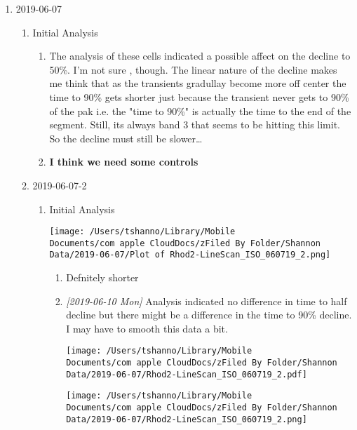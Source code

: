 \documentclass[11pt]{article}
\begin{document}
\begin{enumerate}
\begin{enumerate}
\begin{enumerate}
\begin{enumerate}
\end{enumerate}
\end{enumerate}
\end{enumerate}
\item 2019-06-07
\label{sec:org4dc39f4}
\begin{enumerate}
\item Initial Analysis
\label{sec:org57a14bd}
\begin{enumerate}
\item The analysis of these cells indicated a possible affect on the decline to 50\%.  I'm not sure , though.  The  linear nature of the decline makes me think that as the transients gradullay become more off center the time to 90\% gets shorter just because the transient never gets to 90\% of the pak i.e. the "time to 90\%" is actually the time to the end of the segment.  Still, its always band 3 that seems to be hitting this limit.  So the decline must still be slower\ldots{}
\label{sec:org21e6555}
\item \textbf{I think we need some controls}
\label{sec:org1bd4fc6}
\end{enumerate}
\item 2019-06-07-2
\label{sec:org2132be7}
\begin{enumerate}
\item Initial Analysis
\label{sec:orgee5613b}
\begin{center}
\texttt{[image: /Users/tshanno/Library/Mobile Documents/com~apple~CloudDocs/zFiled By Folder/Shannon Data/2019-06-07/Plot of Rhod2-LineScan\_ISO\_060719\_2.png]}
\end{center}
\begin{enumerate}
\item Defnitely shorter
\label{sec:orgc08e346}
\item \textit{[2019-06-10 Mon] } Analysis indicated no difference in time to half decline but there might be a difference in the time to 90\% decline.  I may have to smooth this data a bit.
\label{sec:org4ae7f59}
\begin{center}
\texttt{[image: /Users/tshanno/Library/Mobile Documents/com~apple~CloudDocs/zFiled By Folder/Shannon Data/2019-06-07/Rhod2-LineScan\_ISO\_060719\_2.pdf]}
\end{center}
\begin{center}
\texttt{[image: /Users/tshanno/Library/Mobile Documents/com~apple~CloudDocs/zFiled By Folder/Shannon Data/2019-06-07/Rhod2-LineScan\_ISO\_060719\_2.png]}
\end{center}

\end{enumerate}
\end{enumerate}
\end{enumerate}
\end{enumerate}
\end{document}
